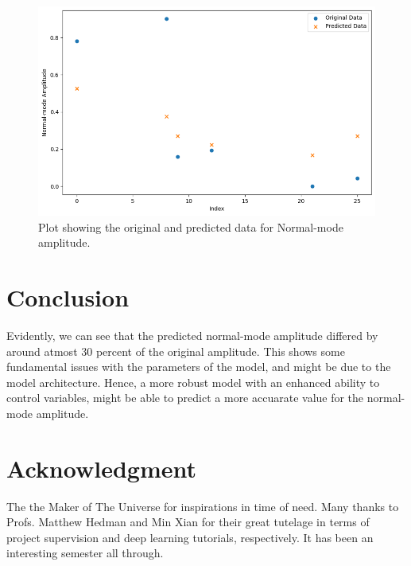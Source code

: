 \documentclass[conference]{IEEEtran}
\begin{document}
\begin{figure}
    \centering
    \includegraphics[width=1\linewidth]{deeplearning_prediction_plots.png}
    \caption{Plot showing the original and predicted data for Normal-mode amplitude.}
    \label{fig:enter-label}
\end{figure}

\section{Conclusion}
Evidently, we can see that the predicted normal-mode amplitude differed by around atmost 30 percent of the original amplitude. This shows some fundamental issues with the parameters of the model, and might be due to the model architecture. Hence, a more robust model with an enhanced ability to control variables, might be able to predict a more accuarate value for the normal-mode amplitude. 

\section{Acknowledgment}
The the Maker of The Universe for inspirations in time of need. Many thanks to Profs. Matthew Hedman and Min Xian for their great tutelage in terms of project supervision and deep learning tutorials, respectively. It has been an interesting semester all through. 


\end{document}
